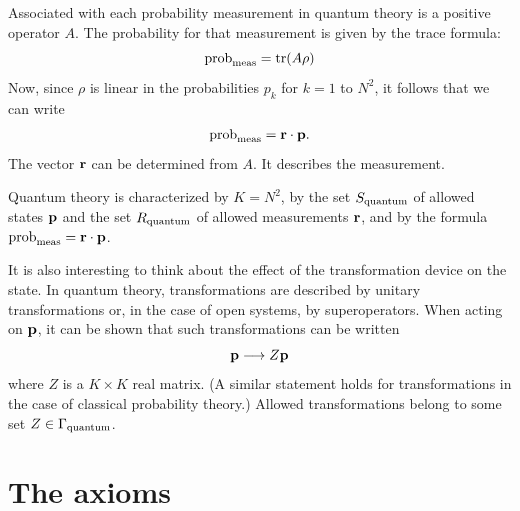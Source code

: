 \documentclass[12pt]{article}
\begin{document}
Associated with each probability measurement in quantum theory is a
positive operator $A$.  The probability for that measurement is given by
the trace formula:
\begin{equation}
{\rm prob}_{\rm meas} = {\rm tr}(A\rho)
\end{equation}
Now, since $\rho$ is linear in the probabilities $p_k$ for $k=1$ to
$N^2$, it follows that we can write
\begin{equation}
{\rm prob}_{\rm meas} = {\bf r}\cdot {\bf p}.
\end{equation}
The vector ${\bf r}$ can be determined from $A$. It describes the
measurement.

Quantum theory is characterized by $K=N^2$,
by the set $S_{\rm quantum}$ of allowed states ${\bf p}$ and the set
$R_{\rm quantum}$ of allowed measurements ${\bf r}$,
and by the formula ${\rm prob}_{\rm meas}={\bf r}\cdot{\bf p}$.

It is also interesting to think about the effect of the transformation
device on the state.  In quantum theory, transformations are described by
unitary transformations or, in the case of open systems, by
superoperators.  When acting on ${\bf p}$, it can be shown that such
transformations can be written
\begin{equation}
{\bf p} \longrightarrow Z{\bf p}
\end{equation}
where $Z$ is a $K\times K$ real matrix.  (A similar statement holds for
transformations in the case of classical probability theory.)
Allowed transformations belong to some set $Z\in \Gamma_{\rm
quantum}$.

\section{The axioms}
\end{document}
